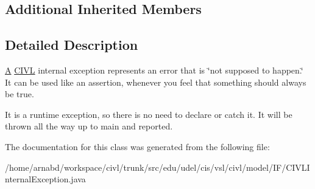 \subsection*{Additional Inherited Members}


\subsection{Detailed Description}
\hyperlink{structA}{A} \hyperlink{classedu_1_1udel_1_1cis_1_1vsl_1_1civl_1_1CIVL}{C\+I\+V\+L} internal exception represents an error that is \char`\"{}not supposed to happen.\char`\"{} It can be used like an assertion, whenever you feel that something should always be true. 

It is a runtime exception, so there is no need to declare or catch it. It will be thrown all the way up to main and reported. 

The documentation for this class was generated from the following file\+:\begin{DoxyCompactItemize}
\item 
/home/arnabd/workspace/civl/trunk/src/edu/udel/cis/vsl/civl/model/\+I\+F/C\+I\+V\+L\+Internal\+Exception.\+java\end{DoxyCompactItemize}
